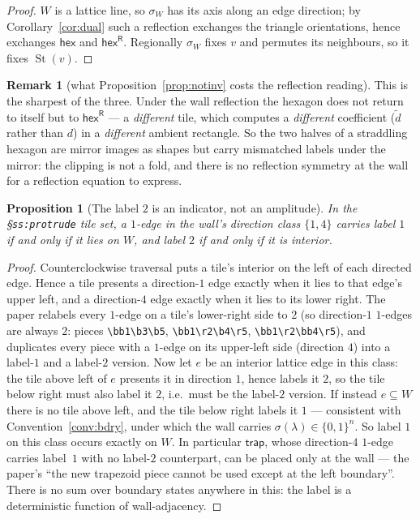 \documentclass[11pt]{article}
\newtheorem{proposition}[theorem]{Proposition}
\theoremstyle{definition}
\newtheorem{remark}[theorem]{Remark}
\newcommand{\hex}{\mathsf{hex}}
\newcommand{\hexR}{\mathsf{hex}^{\mathsf{R}}}
\newcommand{\trap}{\mathsf{trap}}
\newcommand{\la}{\lambda}
\newcommand{\Star}{\operatorname{St}}
\begin{document}
\begin{proof}
$W$ is a lattice line, so $\sigma_W$ has its axis along an edge direction;
by Corollary~\ref{cor:dual} such a reflection exchanges the triangle
orientations, hence exchanges $\hex$ and $\hexR$. Regionally $\sigma_W$ fixes
$v$ and permutes its neighbours, so it fixes $\Star(v)$.
\end{proof}

\begin{remark}[what Proposition~\ref{prop:notinv} costs the reflection reading]
This is the sharpest of the three. Under the wall reflection the hexagon does
not return to itself but to $\hexR$ --- a \emph{different} tile, which computes a
\emph{different} coefficient ($\tilde d$ rather than $d$) in a
\emph{different} ambient rectangle. So the two halves of a straddling hexagon
are mirror images as shapes but carry mismatched labels under the mirror: the
clipping is not a fold, and there is no reflection symmetry at the wall for a
reflection equation to express.
\end{remark}

\begin{proposition}[The label $2$ is an indicator, not an amplitude]
In the \S\texttt{ss:protrude} tile set, a $1$-edge in the wall's direction class
$\{1,4\}$ carries label $1$ if and only if it lies on $W$, and label $2$ if and
only if it is interior.
\end{proposition}

\begin{proof}
Counterclockwise traversal puts a tile's interior on the left of each directed
edge. Hence a tile presents a direction-$1$ edge exactly when it lies to that
edge's upper left, and a direction-$4$ edge exactly when it lies to its lower
right. The paper relabels every $1$-edge on a tile's lower-right side to $2$
(so direction-$1$ $1$-edges are always $2$: pieces \verb|\bb1\b3\b5|,
\verb|\bb1\r2\b4\r5|, \verb|\bb1\r2\bb4\r5|), and duplicates every piece with a
$1$-edge on its upper-left side (direction $4$) into a label-$1$ and a label-$2$
version. Now let $e$ be an interior lattice edge in this class: the tile above
left of $e$ presents it in direction $1$, hence labels it $2$, so the tile below
right must also label it $2$, i.e.\ must be the label-$2$ version. If instead
$e\subseteq W$ there is no tile above left, and the tile below right labels it
$1$ --- consistent with Convention~\ref{conv:bdry}, under which the wall carries
$\sigma(\la)\in\{0,1\}^n$. So label $1$ on this class occurs exactly on $W$.
In particular $\trap$, whose direction-$4$ $1$-edge carries label~$1$ with no
label-$2$ counterpart, can be placed only at the wall --- the paper's ``the new
trapezoid piece cannot be used except at the left boundary''. There is no sum
over boundary states anywhere in this: the label is a deterministic function of
wall-adjacency.
\end{proof}
\end{document}
